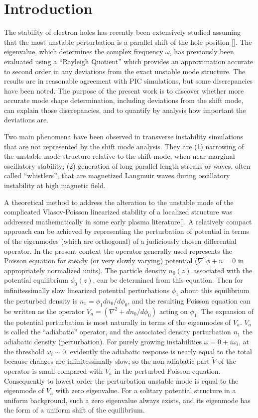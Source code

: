 \documentclass[12pt]{article}
\begin{document}
\section{Introduction}

The stability of electron holes has recently been extensively studied
assuming that the most unstable perturbation is a parallel shift of
the hole position []. The eigenvalue, which determines the complex
frequency $\omega$, has previously been evaluated using a ``Rayleigh
Quotient'' which provides an approximation accurate to second order in
any deviations from the exact unstable mode structure. The results are
in reasonable agreement with PIC simulations, but some discrepancies
have been noted. The purpose of the present work is to discover
whether more accurate mode shape determination, including deviations
from the shift mode, can explain those discrepancies, and to quantify
by analysis how important the deviations are.

Two main phenomena have been observed in transverse instability
simulations that are not represented by the shift mode analysis. They
are (1) narrowing of the unstable mode structure relative to the shift
mode, when near marginal oscillatory stability; (2) generation of long
parallel length streaks or waves, often called ``whistlers'', that are
magnetized Langmuir waves during oscillatory instability at high
magnetic field.

A theoretical method to address the alteration to the unstable mode of
the complicated Vlasov-Poisson linearized stability of a localized
structure was addressed mathematically in some early plasma
literature[]. A relatively compact approach can be achieved by
representing the perturbation of potential in terms of the eigenmodes
(which are orthogonal) of a judiciously chosen differential
operator. In the present context the operator generally used
represents the Poisson equation for steady (or very slowly varying)
potential ($\nabla^2\phi+n=0$ in appropriately normalized units). The
particle density $n_0(z)$ associated with the potential equilibrium
$\phi_0(z)$, can be determined from this equation. Then for
infinitessimally slow linearized potential perturbations $\phi_1$
about this equilibrium the perturbed density is
$n_1=\phi_1dn_0/d\phi_0$, and the resulting Poisson equation can be
written as the operator $V_a =(\nabla^2+dn_0/d\phi_0)$ acting on
$\phi_1$. The expansion of the potential perturbation is most
naturally in terms of the eigenmodes of $V_a$. $V_a$ is called the
``adiabatic'' operator, and the associated density perturbation $n_1$
the adiabatic density (perturbation). For purely growing instabilities
$\omega=0+i\omega_i$, at the threshold $\omega_i\sim 0$, evidently the
adiabatic response is nearly equal to the total because changes are
infinitessimally slow; so the non-adiabatic part $\tilde V$ of the
operator is small compared with $V_a$ in the perturbed Poisson
equation. Consequently to lowest order the perturbation unstable mode
is equal to the eigenmode of $V_a$ with zero eigenvalue. For a
solitary potential structure in a uniform background, such a zero
eigenvalue always exists, and its eigenmode has the form of a uniform
shift of the equilibrium.
\end{document}
